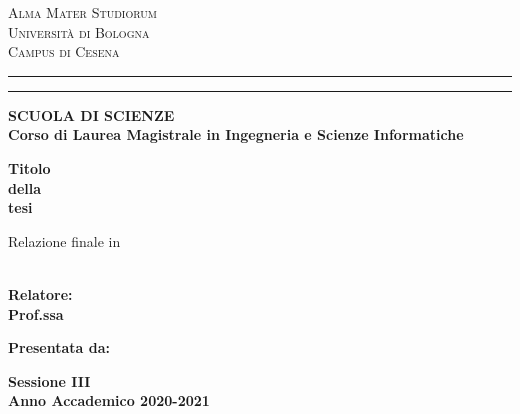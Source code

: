 
\oddsidemargin=25pt

\begin{titlepage}
\begin{center}
{{\Large{\textsc{Alma Mater Studiorum}}}\\
{\Large{\textsc{Universit\`a di Bologna}}} \\
{\textsc{Campus di Cesena}}} \rule[0.1cm]{14cm}{0.1mm}
		\rule[0.5cm]{14cm}{0.6mm}
{\small{\bf SCUOLA DI SCIENZE\\
Corso di Laurea Magistrale in Ingegneria e Scienze Informatiche }}
\end{center}
\vspace{15mm}
\begin{center}
{\LARGE{\bf Titolo}}\\
\vspace{3mm}
{\LARGE{\bf della}}\\
\vspace{3mm}
{\LARGE{\bf tesi}}\\
\end{center}
\vspace{3mm}
\begin{center}
{Relazione finale in}\\
\vspace{2mm}
{\bf \xsubject}\\
\end{center}
\vspace{20mm}
\par
\noindent
\begin{minipage}[t]{0.5\textwidth}
{\large{\bf Relatore:\\
Prof.ssa \xsupervisor}} \\
\end{minipage}
\hfill
\begin{minipage}[t]{0.47\textwidth}\raggedleft
{\large{\bf Presentata da:\\
\xstudent}}
\end{minipage}
\vspace{30mm}
\begin{center}
{\large{\bf Sessione III\\%
Anno Accademico 2020-2021}}%
\end{center}

\newpage
\clearpage{\pagestyle{empty}\cleardoublepage}
\end{titlepage}


